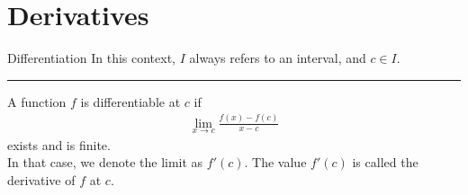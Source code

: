 \documentclass[10pt]{extarticle}
\begin{document}
  \section{Derivatives}%
  \begin{problem}{Differentiation}
    In this context, $I$ always refers to an interval, and $c\in I$.\\
    \vspace{4pt}
    \rule{\textwidth}{0.4pt}
    \vspace{4pt}
    A function $f$ is differentiable at $c$ if
    \begin{align*}
      \lim_{x\rightarrow c}\frac{f(x) - f(c)}{x-c}
    \end{align*}
    exists and is finite.\\

    In that case, we denote the limit as $f'(c)$. The value $f'(c)$ is called the derivative of $f$ at $c$.\\


\end{problem}
\end{document}

